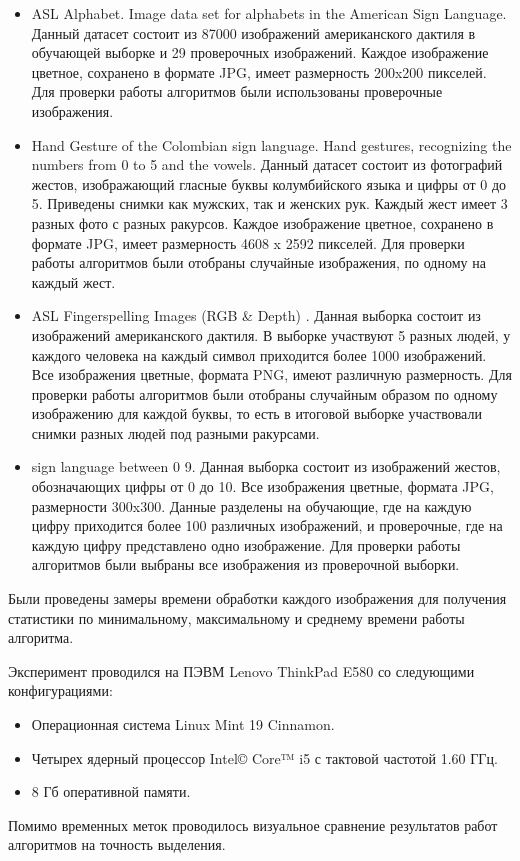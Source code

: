 \begin{itemize}
	\item ASL Alphabet. Image data set for alphabets in the American Sign Language\cite{AslAlphabet}. Данный датасет состоит из 87000 изображений американского дактиля в обучающей выборке и 29 проверочных изображений. Каждое изображение цветное, сохранено в формате JPG, имеет размерность 200x200 пикселей. Для проверки работы алгоритмов были использованы проверочные изображения.
	
	\item Hand Gesture of the Colombian sign language. Hand gestures, recognizing the numbers from 0 to 5 and the vowels\cite{Colombian}. Данный датасет состоит из фотографий жестов, изображающий гласные буквы колумбийского языка и цифры от 0 до 5. Приведены снимки как мужских, так и женских рук. Каждый жест имеет 3 разных фото с разных ракурсов. Каждое изображение цветное, сохранено в формате JPG, имеет размерность 4608 x 2592 пикселей. Для проверки работы алгоритмов были отобраны случайные изображения, по одному на каждый жест.
	
	\item ASL Fingerspelling Images (RGB \& Depth) \cite{asl2}. Данная выборка состоит из изображений американского дактиля. В выборке участвуют 5 разных людей, у каждого человека на каждый символ приходится более 1000 изображений. Все изображения цветные, формата PNG, имеют различную размерность. Для проверки работы алгоритмов были отобраны случайным образом по одному изображению для каждой буквы, то есть в итоговой выборке участвовали снимки разных людей под разными ракурсами.
	
	\item sign language between 0 9\cite{sl09}. Данная выборка состоит из изображений жестов, обозначающих цифры от 0 до 10. Все изображения цветные, формата JPG, размерности 300x300. Данные разделены на обучающие, где на каждую цифру приходится более 100 различных изображений, и проверочные, где на каждую цифру представлено одно изображение. Для проверки работы алгоритмов были выбраны все изображения из проверочной выборки. 
	
\end{itemize}

 Были проведены замеры времени обработки каждого изображения для получения статистики по минимальному, максимальному и среднему времени работы алгоритма.
 
 Эксперимент проводился на ПЭВМ Lenovo ThinkPad E580 со следующими конфигурациями:
 
 \begin{itemize}
 	\item Операционная система Linux Mint 19 Cinnamon.
 	\item Четырех ядерный процессор Intel© Core™ i5 с тактовой частотой 1.60 ГГц.
 	\item 8 Гб оперативной памяти.
 \end{itemize}

Помимо временных меток проводилось визуальное сравнение результатов работ алгоритмов на точность выделения.